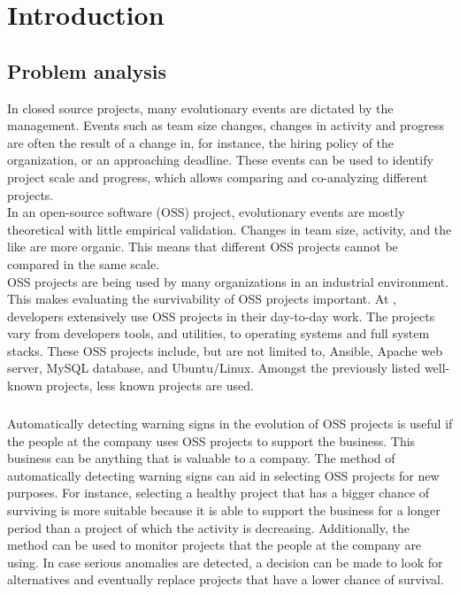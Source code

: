 \chapter{Introduction}
\label{introduction}

\section{Problem analysis}

In closed source projects, many evolutionary events are dictated by the
management.
Events such as team size changes, changes in activity and progress are often the
result of a change in, for instance, the hiring policy of the organization, or
an approaching deadline. These events can be used to identify project scale and
progress, which allows comparing and co-analyzing different projects.\\

In an open-source software (OSS) project, evolutionary events are mostly
theoretical with little empirical validation. Changes in team size, activity,
and the like are more organic. This means that different OSS projects cannot be
compared in the same scale.\\

OSS projects are being used by many organizations in an industrial environment.
This makes evaluating the survivability of OSS projects important.
At \theOrganization, developers extensively use OSS projects in their day-to-day
work. The projects vary from developers tools, and utilities, to operating
systems and full system stacks. These OSS projects include, but are not limited
to, Ansible, Apache web server, MySQL database, and Ubuntu/Linux. Amongst the
previously listed well-known projects, less known projects are used.

\paragraph{}
Automatically detecting warning signs in the evolution of OSS projects is useful
if the people at the company uses OSS projects to support the business. This
business can be anything that is valuable to a company. The method of
automatically detecting warning signs can aid in selecting OSS projects for new
purposes. For instance, selecting a healthy project that has a bigger chance of
surviving is more suitable because it is able to support the business for a
longer period than a project of which the activity is decreasing. Additionally,
the method can be used to monitor projects that the people at the company are
using. In case serious anomalies are detected, a decision can be made to look
for alternatives and eventually replace projects that have a lower chance of
survival.

